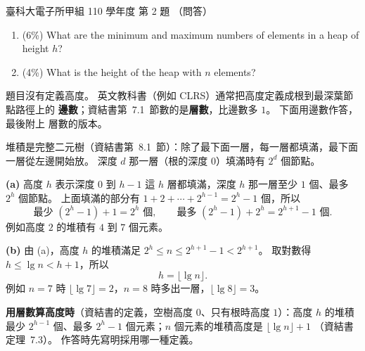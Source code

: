 \begin{pastexam}[label={px:ntust-110-ete-ds-02}]{臺科大電子所甲組 110 學年度 第 2 題}
（問答）

\begin{enumerate}[label=(\alph*)]
\item (6\%) What are the minimum and maximum numbers of elements in a heap of height $h$?
\item (4\%) What is the height of the heap with $n$ elements?
\end{enumerate}
\end{pastexam}

\begin{pastsoln}
題目沒有定義高度。 英文教科書（例如 CLRS）通常把高度定義成根到最深葉節點路徑上的
\textbf{邊數}；資結書第~7.1~節數的是\textbf{層數}，比邊數多 $1$。 下面用邊數作答，最後附上
層數的版本。

堆積是完整二元樹（資結書第~8.1~節）：除了最下面一層，每一層都填滿，最下面一層從左邊開始放。
深度 $d$ 那一層（根的深度 $0$）填滿時有 $2^d$ 個節點。

\textbf{(a)} 高度 $h$ 表示深度 $0$ 到 $h - 1$ 這 $h$ 層都填滿，深度 $h$ 那一層至少 $1$ 個、最多
$2^h$ 個節點。 上面填滿的部分有 $1 + 2 + \cdots + 2^{h-1} = 2^h - 1$ 個，所以
\[
\text{最少 } (2^h - 1) + 1 = 2^h \text{ 個}, \qquad
\text{最多 } (2^h - 1) + 2^h = 2^{h+1} - 1 \text{ 個}.
\]
例如高度 $2$ 的堆積有 $4$ 到 $7$ 個元素。

\textbf{(b)} 由 (a)，高度 $h$ 的堆積滿足 $2^h \le n \le 2^{h+1} - 1 < 2^{h+1}$。 取對數得
$h \le \lg n < h + 1$，所以
\[
h = \lfloor \lg n \rfloor .
\]
例如 $n = 7$ 時 $\lfloor \lg 7 \rfloor = 2$，$n = 8$ 時多出一層，$\lfloor \lg 8 \rfloor = 3$。

\textbf{用層數算高度時}（資結書的定義，空樹高度 $0$、只有根時高度 $1$）：高度 $h$ 的堆積最少
$2^{h-1}$ 個、最多 $2^h - 1$ 個元素；$n$ 個元素的堆積高度是 $\lfloor \lg n \rfloor + 1$
（資結書定理~7.3）。 作答時先寫明採用哪一種定義。
\end{pastsoln}
